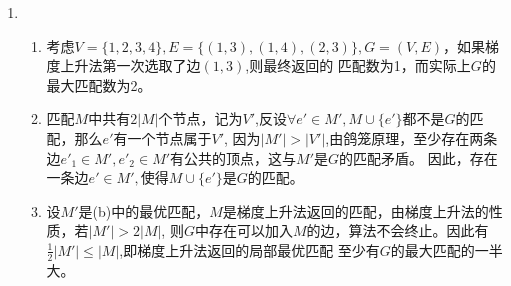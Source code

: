 \documentclass[a4paper]{article}
\begin{document}
\begin{enumerate}[label=\arabic*.]
  \setlength{\itemsep}{3\parskip}
  \setcounter{enumi}{1}
  \item 
    \begin{enumerate}[label=(\alph*)]
    \item 考虑$V=\{1,2,3,4\},E=\{(1,3),(1,4),(2,3)\},G=(V,E)$，如果梯度上升法第一次选取了边$(1,3)$,则最终返回的
    匹配数为1，而实际上$G$的最大匹配数为2。
    \item 匹配$M$中共有$2|M|$个节点，记为$V'$,反设$\forall e'\in M',M\cup \{e'\}$都不是$G$的匹配，那么$e'$有一个节点属于$V'$,
    因为$|M'|>|V'|$,由鸽笼原理，至少存在两条边$e'_1\in M',e'_2 \in M'$有公共的顶点，这与$M'$是$G$的匹配矛盾。
    因此，存在一条边$e'\in M',$使得$M\cup \{e'\}$是$G$的匹配。
    \item 设$M'$是(b)中的最优匹配，$M$是梯度上升法返回的匹配，由梯度上升法的性质，若$|M'|>2|M|$,
    则$G$中存在可以加入$M$的边，算法不会终止。因此有$\frac{1}{2}|M'|\leq |M|$,即梯度上升法返回的局部最优匹配
    至少有$G$的最大匹配的一半大。

    \end{enumerate}
    

\end{enumerate}
\end{document}

